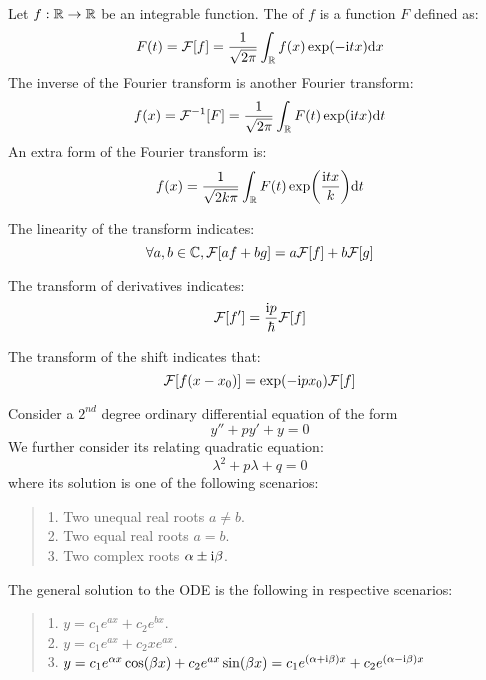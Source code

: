 \label{subsec:fourier}
\begin{definition}
    Let $f: \mathbb{R} \to \mathbb{R}$ be an integrable function. The  of $f$ is a function $F$ defined as:
    $$F(t) = \mathcal{F}[f] = \frac{1}{\sqrt{2\pi}} \int_{\mathbb{R}} f(x) \exp(-\mathrm{i} t x) \dd x$$
    The inverse of the Fourier transform is another Fourier transform:
    $$f(x) = \mathcal{F}^{-1}[F] = \frac{1}{\sqrt{2\pi}} \int_{\mathbb{R}} F(t) \exp(\mathrm{i} t x) \dd t$$
    An extra form of the Fourier transform is:
    $$f(x) = \frac{1}{\sqrt{2k\pi}} \int_{\mathbb{R}} F(t) \exp(\frac{\mathrm{i} t x}{k}) \dd t$$
\end{definition}
\begin{theorem}
    The linearity of the transform indicates:
    $$\forall a, b \in \mathbb{C}, \mathcal{F}[af+bg] = a\mathcal{F}[f] + b\mathcal{F}[g]$$
\end{theorem}
\begin{theorem}
    The transform of derivatives indicates:
    $$\mathcal{F}[f'] = \frac{\mathrm{i} p}{\hbar} \mathcal{F}[f]$$
\end{theorem}
\begin{theorem}
    The transform of the shift indicates that:
    $$\mathcal{F}[f(x-x_0)] = \exp(-\mathrm{i} p x_0)\mathcal{F}[f]$$
\end{theorem}

\label{subsec:differential-eqn}
\begin{theorem}
    Consider a $2^{nd}$ degree ordinary differential equation of the form
    $$y'' + py' + y = 0$$
    We further consider its relating quadratic equation:
    $$\lambda^2 + p\lambda + q = 0$$
    where its solution is one of the following scenarios:
    \begin{quote}
        1. Two unequal real roots $a \ne b$. \\
        2. Two equal real roots $a = b$. \\
        3. Two complex roots $\alpha \pm \mathrm{i} \beta$.
    \end{quote}
    The general solution to the ODE is the following in respective scenarios:
    \begin{quote}
        1. $y = c_1e^{ax} + c_2e^{bx}$. \\
        2. $y = c_1e^{ax} + c_2xe^{ax}$. \\
        3. $y = c_1e^{\alpha x}\cos(\beta x) + c_2e^{ax}\sin(\beta x) = c_1e^{(\alpha + \mathrm{i} \beta)x} + c_2e^{(\alpha - \mathrm{i} \beta)x}$
    \end{quote}
\end{theorem}

\newpage